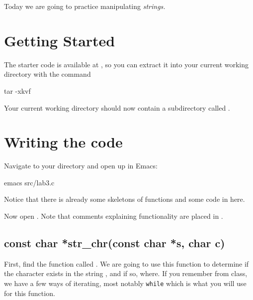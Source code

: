 \documentclass{tufte-handout}
\begin{document}
\maketitle

Today we are going to practice manipulating \emph{strings.}

\section{Getting Started}

The starter code is available at \filename{\ThisLabTgz}, so you can
extract it into your current working directory with the command

\begin{CmdLine*}
  \C tar -xkvf \ThisLabTgz\\
\end{CmdLine*}

\noindent Your current working directory should now contain a
subdirectory called \filename{\ThisLabBase}.

\section{Writing the code}

Navigate to your \filename{\ThisLabBase} directory and open up
 in Emacs:

\begin{CmdLine*}
  \C emacs src/lab3.c \\
\end{CmdLine*}

\noindent
Notice that there is already some skeletons of functions and some code in  here.

Now open . Note that comments explaining
functionality are placed in .

\subsection{{const char *str\_chr(const char *s, char c)}}
First, find the function called
.
We are going to use this function to determine if the character
 exists in the string , and if so, where. If you
remember from class, we have a few ways of iterating, most notably
\texttt{while} which is what you will use for this function.
\end{document}
